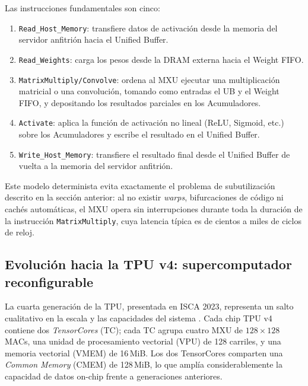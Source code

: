 \documentclass[conference]{IEEEtran}
\begin{document}
Las instrucciones fundamentales son cinco:

\begin{enumerate}
    \item \texttt{Read\_Host\_Memory}: transfiere datos de activación desde la memoria del servidor anfitrión hacia el Unified Buffer.
    
    \item \texttt{Read\_Weights}: carga los pesos desde la DRAM externa hacia el Weight FIFO.
    
    \item \texttt{MatrixMultiply/Convolve}: ordena al MXU ejecutar una multiplicación matricial o una convolución, tomando como entradas el UB y el Weight FIFO, y depositando los resultados parciales en los Acumuladores.
    
    \item \texttt{Activate}: aplica la función de activación no lineal (ReLU, Sigmoid, etc.) sobre los Acumuladores y escribe el resultado en el Unified Buffer.
    
    \item \texttt{Write\_Host\_Memory}: transfiere el resultado final desde el Unified Buffer de vuelta a la memoria del servidor anfitrión.
\end{enumerate}

Este modelo determinista evita exactamente el problema de subutilización descrito en la sección anterior: al no existir \textit{warps}, bifurcaciones de código ni cachés automáticas, el MXU opera sin interrupciones durante toda la duración de la instrucción \texttt{MatrixMultiply}, cuya latencia típica es de cientos a miles de ciclos de reloj.


\subsection{Evolución hacia la TPU v4: supercomputador reconfigurable}

La cuarta generación de la TPU, presentada en ISCA 2023, representa un salto cualitativo en la escala y las capacidades del sistema \cite{jouppi2023tpuv4}.
Cada chip TPU v4 contiene dos \textit{TensorCores} (TC); cada TC agrupa cuatro MXU de $128 \times 128$ MACs, una unidad de procesamiento vectorial (VPU) de 128 carriles, y una memoria vectorial (VMEM) de 16\,MiB. Los dos TensorCores comparten una \textit{Common Memory} (CMEM) de 128\,MiB, lo que amplía considerablemente la capacidad de datos on-chip frente a generaciones anteriores.
\end{document}
